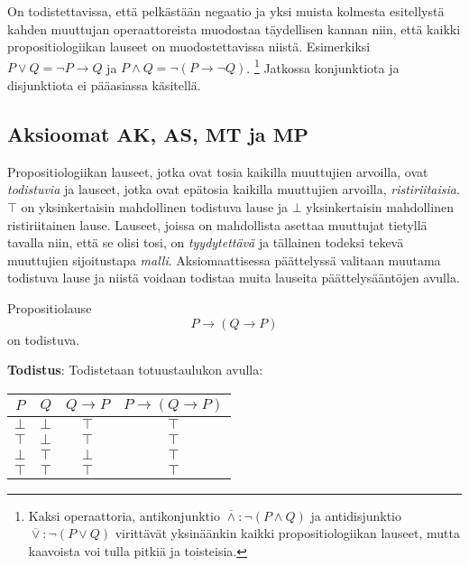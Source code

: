 \documentclass[a4paper,12pt]{amsart}
\begin{document}
On todistettavissa, että pelkästään negaatio ja yksi muista kolmesta esitellystä kahden muuttujan operaattoreista muodostaa täydellisen kannan niin, että kaikki propositiologiikan lauseet on muodostettavissa niistä. Esimerkiksi $P\lor Q=\lnot P\to Q$ ja $P\land Q=\lnot(P\to \lnot Q)$.
\footnote{Kaksi operaattoria, antikonjunktio $\overline\land: \lnot(P\land Q)$ ja antidisjunktio $\overline\lor: \lnot(P\lor Q)$ virittävät yksinäänkin kaikki propositiologiikan lauseet, mutta kaavoista voi tulla pitkiä ja toisteisia.}
Jatkossa konjunktiota ja disjunktiota ei pääasiassa käsitellä.
\subsection{Aksioomat $\mathbf{AK}$, $\mathbf{AS}$, $\mathbf{MT}$ ja $\mathbf{MP}$}
Propositiologiikan lauseet, jotka ovat tosia kaikilla muuttujien arvoilla, ovat \emph{todistuvia} ja lauseet, jotka ovat epätosia kaikilla muuttujien arvoilla, \emph{ristiriitaisia}. $\top$ on yksinkertaisin mahdollinen todistuva lause ja $\bot$ yksinkertaisin mahdollinen ristiriitainen lause. Lauseet, joissa on mahdollista asettaa muuttujat tietyllä tavalla niin, että se olisi tosi, on \emph{tyydytettävä} ja tällainen todeksi tekevä muuttujien sijoitustapa \emph{malli}. Aksiomaattisessa päättelyssä valitaan muutama todistuva lause ja niistä voidaan todistaa muita lauseita päättelysääntöjen avulla.
\begin{lause}\label{ak}
Propositiolause
$$
P\to(Q\to P)
$$
on todistuva.

{\bf Todistus}: Todistetaan totuustaulukon avulla:

\begin{tabular}{c|c|c|c}
$P$ & $Q$ & $Q\to P$ & $P\to (Q\to P)$ \\
\hline
\hline
$\bot$ & $\bot$ & $\top$ & $\top$ \\
\hline
$\top$ & $\bot$ & $\top$ & $\top$ \\
\hline
$\bot$ & $\top$ & $\bot$ & $\top$ \\
\hline
$\top$ & $\top$ & $\top$ & $\top$ \\
\end{tabular}
\end{lause}
\end{document}
